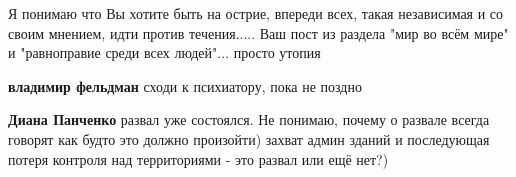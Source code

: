 \begin{itemize}
\begin{itemize}
Я понимаю что Вы хотите быть на острие, впереди всех, такая независимая и со
своим мнением, идти против течения..... Ваш пост из раздела "мир во всём мире"
и "равноправие среди всех людей"... просто утопия


 
\textbf{владимир фельдман} сходи к психиатору, пока не поздно

 
\textbf{Диана Панченко} развал уже состоялся. Не понимаю, почему о развале
всегда говорят как будто это должно произойти) захват админ зданий и
последующая потеря контроля над территориями - это развал или ещё нет?)
\end{itemize}

\end{itemize}

